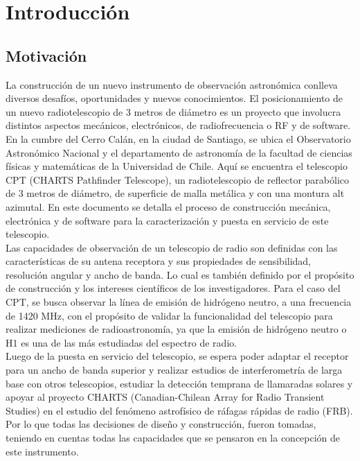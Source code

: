 \chapter{Introducción}
\section{Motivación}

La construcción de un nuevo instrumento de observación astronómica conlleva diversos desafíos, oportunidades y nuevos conocimientos. El posicionamiento de un nuevo radiotelescopio de 3 metros de diámetro es un proyecto que involucra distintos aspectos mecánicos, electrónicos, de radiofrecuencia o RF y de software.\\


En la cumbre del Cerro Calán, en la ciudad de Santiago, se ubica el Observatorio Astronómico Nacional y el departamento de astronomía de la facultad de ciencias físicas y matemáticas de la Universidad de Chile. Aquí se encuentra el telescopio CPT (CHARTS Pathfinder Telescope), un radiotelescopio de reflector parabólico de 3 metros de diámetro, de superficie de malla metálica y con una montura alt azimutal. En este documento se detalla el proceso de construcción mecánica, electrónica y de software para la caracterización y puesta en servicio de este telescopio.\\ 

Las capacidades de observación de un telescopio de radio son definidas con las características de su antena receptora y sus propiedades de sensibilidad, resolución angular y ancho de banda. Lo cual es también definido por el propósito de construcción y los intereses científicos de los investigadores. Para el caso del CPT, se busca observar la línea de emisión de hidrógeno neutro, a una frecuencia de 1420 MHz, con el propósito de validar la funcionalidad del telescopio para realizar mediciones de radioastronomía, ya que la emisión de hidrógeno neutro o H1 es una de las más estudiadas del espectro de radio.\\

Luego de la puesta en servicio del telescopio, se espera poder adaptar el receptor para un ancho de banda superior y realizar estudios de interferometría de larga base con otros telescopios, estudiar la detección temprana de llamaradas solares y apoyar al proyecto CHARTS (Canadian-Chilean Array for Radio Transient Studies) en el estudio del fenómeno astrofísico de ráfagas rápidas de radio (FRB). Por lo que todas las decisiones de diseño y construcción, fueron tomadas, teniendo en cuentas todas las capacidades que se pensaron en la concepción de este instrumento.\\


